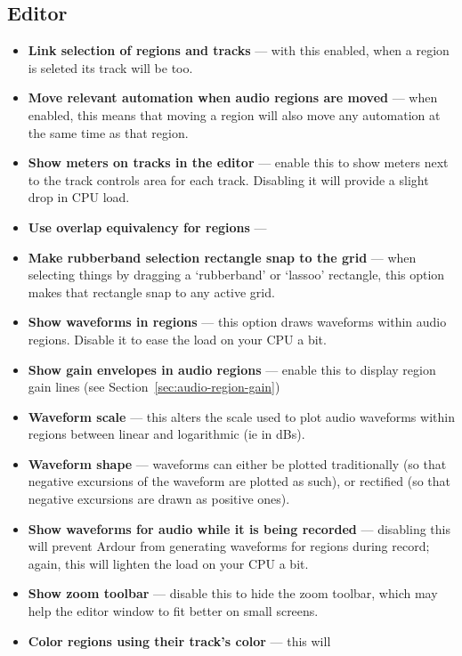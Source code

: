 \documentclass[10pt,a4paper]{book}
\newcommand{\todo}[1]{\marginpar{\small\texttt{#1}}}
\begin{document}
{\subsection{Editor}
\label{sec:ardour-preferences-editor}

\begin{itemize}
\item \textbf{Link selection of regions and tracks} --- with this
  enabled, when a region is seleted its track will be too.
\item \textbf{Move relevant automation when audio regions are moved}
  --- when enabled, this means that moving a region will also move any
  automation at the same time as that region.
\item \textbf{Show meters on tracks in the editor} --- enable this to
  show meters next to the track controls area for each track.
  Disabling it will provide a slight drop in CPU load.
\item \textbf{Use overlap equivalency for regions} --- \todo{?!}
\item \textbf{Make rubberband selection rectangle snap to the grid}
  --- when selecting things by dragging a `rubberband' or `lassoo'
  rectangle, this option makes that rectangle snap to any active grid.
\item \textbf{Show waveforms in regions} --- this option draws
  waveforms within audio regions.  Disable it to ease the load on your
  CPU a bit.
\item \textbf{Show gain envelopes in audio regions} --- enable this to
  display region gain lines (see Section~\ref{sec:audio-region-gain})
\item \textbf{Waveform scale} --- this alters the scale used to plot
  audio waveforms within regions between linear and logarithmic (ie in
  dBs).
\item \textbf{Waveform shape} --- waveforms can either be plotted
  traditionally (so that negative excursions of the waveform are
  plotted as such), or rectified (so that negative excursions are
  drawn as positive ones).
\item \textbf{Show waveforms for audio while it is being recorded} ---
  disabling this will prevent Ardour from generating waveforms for
  regions during record; again, this will lighten the load on your CPU
  a bit.
\item \textbf{Show zoom toolbar} --- disable this to hide the zoom
  toolbar, which may help the editor window to fit better on small
  screens.
\item \textbf{Color regions using their track's color} --- this will

\end{itemize}}
\end{document}

